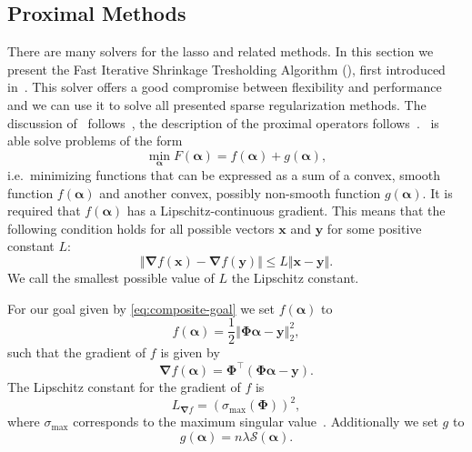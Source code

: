 \subsection{Proximal Methods}
There are many solvers for the lasso and related methods.
In this section we present the Fast Iterative Shrinkage Tresholding Algorithm (\fista), first introduced in~\cite{fista}.
This solver offers a good compromise between flexibility and performance and we can use it to solve all presented sparse regularization methods.
The discussion of \fista\ follows~\cite{fista}, the description of the proximal operators follows~\cite{proxsurvey}.
\fista\ is able solve problems of the form
\begin{equation}\label{eq:composite-goal}
\min_{\bm{\alpha}} F(\bm{\alpha}) = f(\bm{\alpha}) + g(\bm{\alpha}),
\end{equation}
i.e.~minimizing functions that can be expressed as a sum of a convex, smooth function \(f(\bm{\alpha})\) and another convex, possibly non-smooth function \(g(\bm{\alpha})\).
It is required that \(f(\bm{\alpha})\) has a Lipschitz-continuous gradient. 
This means that the following condition holds for all possible vectors \(\bm{x}\) and \(\bm{y}\) for some positive constant \(L\):
\begin{equation}   \label{eq:lipschitz}
 \Vert \bm{\nabla} f(\bm{x}) - \bm{\nabla} f(\bm{y}) \Vert \leq L \Vert \bm{x} - \bm{y} \Vert.
\end{equation}
We call the smallest possible value of \(L\) the Lipschitz constant.

For our goal given by \cref{eq:composite-goal} we set \(f(\bm{\alpha})\) to
\begin{equation*}
 f(\bm{\alpha}) = \frac{1}{2} \left\Vert  \bm{\Phi} \bm{\alpha} - \bm{y}   \right\Vert_2^2,
\end{equation*}
such that the gradient of \(f\) is given by
\begin{equation*}
  \bm{\nabla} f(\bm{\alpha}) = \bm{\Phi}^\intercal \left(\bm{\Phi} \bm{\alpha} - \bm{y} \right).
\end{equation*}
The Lipschitz constant for the gradient of \(f\) is
\begin{equation}
  \label{eq:lipf}
  L_{\bm{\nabla} f} = {\left(\sigma_{\max} \left(\bm{\Phi}\right)\right)}^2,
\end{equation}
where \(\sigma_{\max} \) corresponds to the maximum singular value~\autocite{fista}.
Additionally we set \(g\) to
\begin{equation*}
  g(\bm{\alpha}) = n \lambda \mathcal{S} \left( \bm{\alpha} \right).
\end{equation*}


